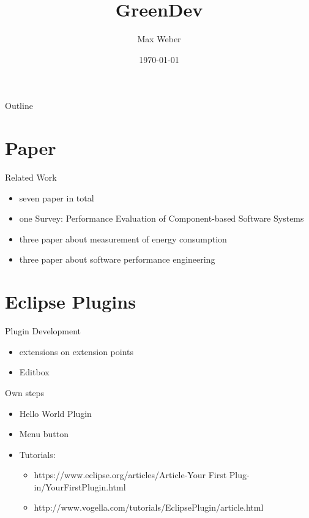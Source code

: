 \documentclass[11pt,aspectratio=169]{beamer}
\title[Green Development]{GreenDev}
\author[M. Weber]{Max Weber}
\institute[Bauhaus-Universität Weimar]{}
\date[\today]{\today}
\begin{document}

\maketitle

\begin{frame}{Outline}
\tableofcontents
\end{frame}

\section{Paper}

\begin{frame}{Related Work}
  \begin{itemize}
    \item seven paper in total
    \item one Survey: Performance Evaluation of Component-based Software Systems
    \item three paper about measurement of energy consumption
    \item three paper about software performance engineering
  \end{itemize}
\end{frame}

\section{Eclipse Plugins}

\begin{frame}{Plugin Development}
  \begin{itemize}
    \item extensions on extension points
    \item Editbox
  \end{itemize}
\end{frame}


\begin{frame}{Own steps}
  \begin{itemize}
    \item Hello World Plugin
    \item Menu button
    \item Tutorials: 
    \begin{itemize}
      \item https://www.eclipse.org/articles/Article-Your First Plug-in/YourFirstPlugin.html
      \item http://www.vogella.com/tutorials/EclipsePlugin/article.html
    \end{itemize}
  \end{itemize}
\end{frame}
\end{document}
